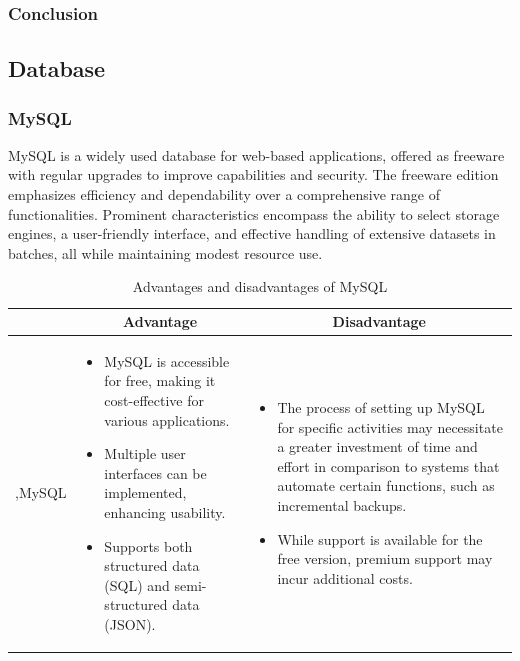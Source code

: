 \subsubsection{Conclusion}

\subsection{Database}

\subsubsection{MySQL}

MySQL is a widely used database for web-based applications, offered as freeware with regular upgrades to improve capabilities and security. The freeware edition emphasizes efficiency and dependability over a comprehensive range of functionalities. Prominent characteristics encompass the ability to select storage engines, a user-friendly interface, and effective handling of extensive datasets in batches, all while maintaining modest resource use.

\begin{table}[H]
    \centering
    \begin{tabular}{| c | p{} | p{} |}
        \hline
        \multicolumn{1}{|c|}{}
        & \multicolumn{1}{c|}{Advantage}
        & \multicolumn{1}{c|}{Disadvantage} \\ \hline
        \multirow{7}{*}{,MySQL}     
                &   \begin{itemize}[leftmargin=*,topsep=0pt,partopsep=0pt,parsep=0pt]
                        \item MySQL is accessible for free, making it cost-effective for various applications.
                        \item Multiple user interfaces can be implemented, enhancing usability.
                        \item Supports both structured data (SQL) and semi-structured data (JSON).
                    \end{itemize}
                &   \begin{itemize}[leftmargin=*,topsep=0pt,partopsep=0pt,parsep=0pt]
                        \item The process of setting up MySQL for specific activities may necessitate a greater investment of time and effort in comparison to systems that automate certain functions, such as incremental backups.
                        \item While support is available for the free version, premium support may incur additional costs.
                    \end{itemize} \\ \hline
    \end{tabular}
    \caption{Advantages and disadvantages of MySQL}
\end{table}

